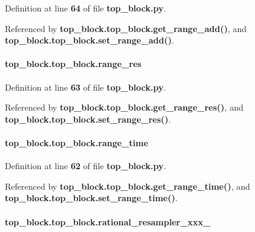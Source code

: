 Definition at line {\bf 64} of file {\bf top\+\_\+block.\+py}.



Referenced by {\bf top\+\_\+block.\+top\+\_\+block.\+get\+\_\+range\+\_\+add()}, and {\bf top\+\_\+block.\+top\+\_\+block.\+set\+\_\+range\+\_\+add()}.

\paragraph[{range\+\_\+res}]{\setlength{\rightskip}{0pt plus 5cm}top\+\_\+block.\+top\+\_\+block.\+range\+\_\+res}\label{classtop__block_1_1top__block_a1b7be0ec8ed446fd743751341ec80d53}


Definition at line {\bf 63} of file {\bf top\+\_\+block.\+py}.



Referenced by {\bf top\+\_\+block.\+top\+\_\+block.\+get\+\_\+range\+\_\+res()}, and {\bf top\+\_\+block.\+top\+\_\+block.\+set\+\_\+range\+\_\+res()}.

\paragraph[{range\+\_\+time}]{\setlength{\rightskip}{0pt plus 5cm}top\+\_\+block.\+top\+\_\+block.\+range\+\_\+time}\label{classtop__block_1_1top__block_a61e3f35de83b360a1bcc1d92775d8560}


Definition at line {\bf 62} of file {\bf top\+\_\+block.\+py}.



Referenced by {\bf top\+\_\+block.\+top\+\_\+block.\+get\+\_\+range\+\_\+time()}, and {\bf top\+\_\+block.\+top\+\_\+block.\+set\+\_\+range\+\_\+time()}.

\paragraph[{rational\+\_\+resampler\+\_\+xxx\+\_\+0}]{\setlength{\rightskip}{0pt plus 5cm}top\+\_\+block.\+top\+\_\+block.\+rational\+\_\+resampler\+\_\+xxx\+\_}\label{classtop__block_1_1top__block_a3c720a8a8044a30f0feb094400eeeb98}


